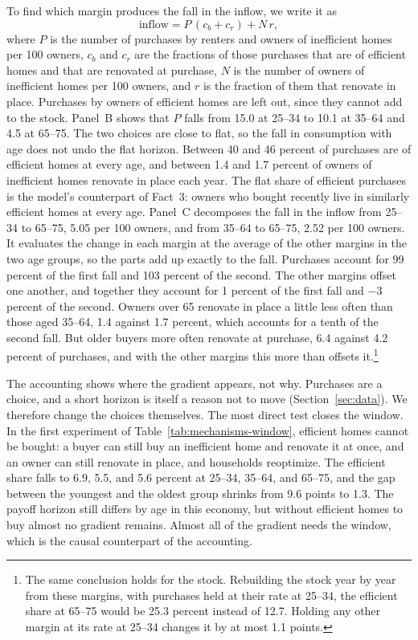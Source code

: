 To find which margin produces the fall in the inflow, we write it as
\begin{equation*}
  \text{inflow}=P\,(c_b+c_r)+N\,r,
\end{equation*}
where $P$ is the number of purchases by renters and owners of inefficient
homes per 100 owners, $c_b$ and $c_r$ are the fractions of those purchases
that are of efficient homes and that are renovated at purchase, $N$ is the
number of owners of inefficient homes per 100 owners, and $r$ is the
fraction of them that renovate in place. Purchases by owners of efficient
homes are left out, since they cannot add to the stock. Panel~B shows that
$P$ falls from 15.0 at 25--34 to 10.1 at 35--64 and 4.5 at 65--75.  The
two choices are close to flat, so the fall in consumption with age does not
undo the flat horizon. Between 40 and 46 percent of
purchases are of efficient homes at every age, and between 1.4 and 1.7
percent of owners of inefficient homes renovate in place each year. The
flat share of efficient purchases is the model's counterpart of Fact~3:
owners who bought recently live in similarly efficient homes at every age.
Panel~C decomposes the fall in the inflow from 25--34 to 65--75, 5.05 per
100 owners, and from 35--64 to 65--75, 2.52 per 100 owners. It evaluates the
change in each margin at the average of the other margins in the two age
groups, so the parts add up exactly to the fall. Purchases account for 99
percent of the first fall and 103 percent of the second. The other margins
offset one another, and together they account for 1 percent of the first
fall and $-3$ percent of the second. Owners over 65 renovate in place a
little less often than those aged 35--64, 1.4 against 1.7 percent, which
accounts for a tenth of the second fall. But older buyers more often
renovate at purchase, 6.4 against 4.2 percent of purchases, and with the
other margins this more than offsets it.\footnote{ The same conclusion holds for the stock. Rebuilding
the stock year by year from these margins, with purchases held at their rate
at 25--34, the efficient share at 65--75 would be 25.3 percent instead of
12.7. Holding any other margin at its rate at 25--34 changes it by at most
1.1 points. }

The accounting shows where the gradient appears, not why. Purchases are a
choice, and a short horizon is itself a reason not to move
(Section~\ref{sec:data}). We therefore change the choices themselves. The
most direct test closes the window. In the first experiment of
Table~\ref{tab:mechanisms-window}, efficient homes cannot be bought: a buyer can
still buy an inefficient home and renovate it at once, and an owner can
still renovate in place, and households reoptimize. The efficient share
falls to 6.9, 5.5, and 5.6 percent at 25--34, 35--64, and 65--75, and the gap
between the youngest and the oldest group shrinks from 9.6 points to 1.3.
The payoff horizon still differs by age in this economy, but without
efficient homes to buy almost no gradient remains. Almost all of the
gradient needs the window, which is the causal counterpart of the
accounting.

